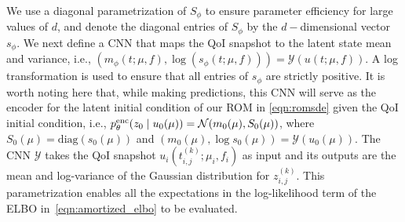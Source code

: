 \documentclass{article}
\begin{document}
	We use a diagonal parametrization of $S_{\phi}$ to ensure parameter efficiency for large values of $d$, and denote the diagonal entries of $S_\phi$ by the $d-$dimensional vector $s_\phi$. We next define a CNN that maps the QoI snapshot to the latent state mean and variance, i.e., $(m_\phi(t;\mu,f), \log(s_\phi(t;\mu,f))) = \mathcal{Y}(u(t;\mu,f))$. A log transformation is used to ensure that all entries of $s_\phi$ are strictly positive. It is worth noting here that, while making predictions, this CNN will serve as the encoder for the latent initial condition of our ROM in \eqref{eqn:romsde} given the QoI initial condition, i.e., $p_\theta^{\rm enc} (z_0 \;|\;u_0(\mu)) = \mathcal{N}(m_0(\mu),S_0(\mu))$, where  $S_0(\mu) = \text{diag}(s_0(\mu))$ and $(m_0(\mu), \log s_0(\mu)) = \mathcal{Y}(u_0(\mu))$. The CNN $\mathcal{Y}$ takes the QoI snapshot $u_i(t_{i,j}^{(k)};\mu_i,f_i)$ as input and its outputs are the mean and log-variance of the Gaussian distribution for $z_{i,j}^{(k)}$. This parametrization enables all the expectations in the log-likelihood term of the ELBO in~\eqref{eqn:amortized_elbo} to be evaluated. 
	
\end{document}
